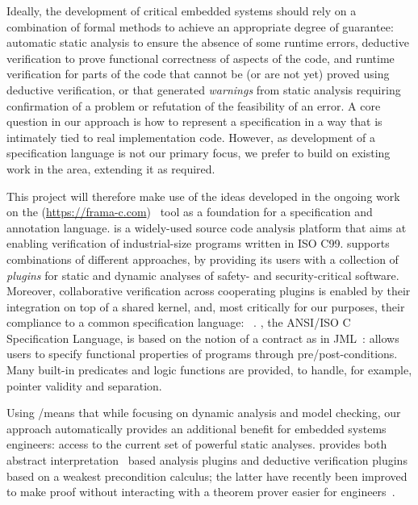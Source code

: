 Ideally, the development of critical embedded systems should rely on a combination of formal methods to achieve an appropriate degree of guarantee:
automatic static analysis to ensure the absence of some runtime errors,
deductive verification to prove functional correctness of aspects of the code,
and runtime verification for parts of the code that cannot be (or are not yet) proved using deductive verification,
or that generated \emph{warnings} from static analysis requiring confirmation of a problem or refutation of the feasibility of an error.  A core question in our approach is how to represent a specification in a way that is intimately tied to real implementation code.  However, as development of a specification language is not our primary focus, we prefer to build on existing work in the area, extending it as required.

This project will therefore make use of the ideas developed in the ongoing work on the \framac{} (\url{https://frama-c.com})~\cite{KKP2015:FAC} tool as a foundation for a specification and annotation language.
\framac is a widely-used source code analysis platform that aims at enabling verification of industrial-size programs written in ISO C99.
\framac{} supports combinations of different approaches, by providing its users with a collection of \emph{plugins} for static and dynamic analyses of safety- and security-critical software.
Moreover, collaborative verification across cooperating plugins is enabled by their integration on top of a shared kernel, and, most critically for our purposes, their compliance to a common specification language: \acsl~\cite{ACSL}.
\acsl, the ANSI/ISO C Specification Language, is based on the notion of a contract as in JML~\cite{jml}: \acsl allows users to specify functional properties of programs through pre/post-conditions.
Many built-in predicates and logic functions are provided, to handle, for example, pointer validity and separation.

Using \acsl/\framac means that while focusing on dynamic analysis and model checking, our approach automatically provides an additional benefit for embedded systems engineers: access to the current set of powerful \framac static analyses.  \framac provides both abstract interpretation~\cite{cousot77} based analysis plugins and deductive verification plugins based on a weakest precondition calculus; the latter have recently been improved to make proof without interacting with a theorem prover easier for engineers~\cite{BLK2019:NFM}.

